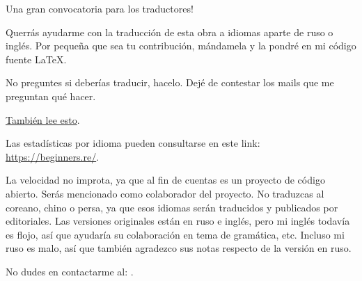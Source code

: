 \vspace*{\fill}

\¡Una gran convocatoria para los traductores!

\normalsize

\bigskip
\bigskip
\bigskip

Querrás ayudarme con la traducción de esta obra a idiomas aparte de ruso o inglés.
Por pequeña que sea tu contribución, mándamela y la pondré en mi código fuente LaTeX.

No preguntes si deberías traducir, hacelo. Dejé de contestar los mails que me preguntan qué hacer.

\href{\RepoURL/Translation.md}{También lee esto}.

Las estadísticas por idioma pueden consultarse en este link: \url{https://beginners.re/}.

La velocidad no improta, ya que al fin de cuentas es un proyecto de código abierto.
Serás mencionado como colaborador del proyecto.
No traduzcas al coreano, chino o persa, ya que esos idiomas serán traducidos y publicados por editoriales.
Las versiones originales están en ruso e inglés, pero mi inglés todavía es flojo, así que ayudaría su colaboración en tema de gramática, etc.
Incluso mi ruso es malo, así que también agradezco sus notas respecto de la versión en ruso.%

No dudes en contactarme al: \GTT{\EMAILS}.

\vspace*{\fill}
\vfill
